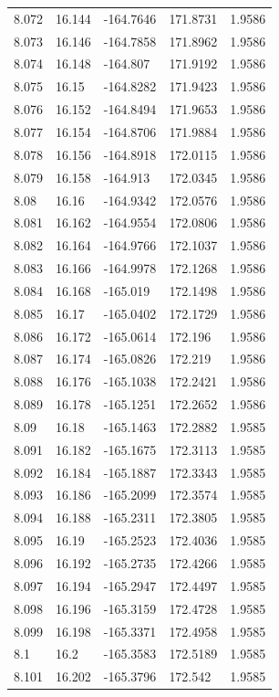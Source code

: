 \begin{tabular}{lllll}
8.072 & 16.144 & -164.7646 & 171.8731 & 1.9586 \\
8.073 & 16.146 & -164.7858 & 171.8962 & 1.9586 \\
8.074 & 16.148 & -164.807 & 171.9192 & 1.9586 \\
8.075 & 16.15 & -164.8282 & 171.9423 & 1.9586 \\
8.076 & 16.152 & -164.8494 & 171.9653 & 1.9586 \\
8.077 & 16.154 & -164.8706 & 171.9884 & 1.9586 \\
8.078 & 16.156 & -164.8918 & 172.0115 & 1.9586 \\
8.079 & 16.158 & -164.913 & 172.0345 & 1.9586 \\
8.08 & 16.16 & -164.9342 & 172.0576 & 1.9586 \\
8.081 & 16.162 & -164.9554 & 172.0806 & 1.9586 \\
8.082 & 16.164 & -164.9766 & 172.1037 & 1.9586 \\
8.083 & 16.166 & -164.9978 & 172.1268 & 1.9586 \\
8.084 & 16.168 & -165.019 & 172.1498 & 1.9586 \\
8.085 & 16.17 & -165.0402 & 172.1729 & 1.9586 \\
8.086 & 16.172 & -165.0614 & 172.196 & 1.9586 \\
8.087 & 16.174 & -165.0826 & 172.219 & 1.9586 \\
8.088 & 16.176 & -165.1038 & 172.2421 & 1.9586 \\
8.089 & 16.178 & -165.1251 & 172.2652 & 1.9586 \\
8.09 & 16.18 & -165.1463 & 172.2882 & 1.9585 \\
8.091 & 16.182 & -165.1675 & 172.3113 & 1.9585 \\
8.092 & 16.184 & -165.1887 & 172.3343 & 1.9585 \\
8.093 & 16.186 & -165.2099 & 172.3574 & 1.9585 \\
8.094 & 16.188 & -165.2311 & 172.3805 & 1.9585 \\
8.095 & 16.19 & -165.2523 & 172.4036 & 1.9585 \\
8.096 & 16.192 & -165.2735 & 172.4266 & 1.9585 \\
8.097 & 16.194 & -165.2947 & 172.4497 & 1.9585 \\
8.098 & 16.196 & -165.3159 & 172.4728 & 1.9585 \\
8.099 & 16.198 & -165.3371 & 172.4958 & 1.9585 \\
8.1 & 16.2 & -165.3583 & 172.5189 & 1.9585 \\
8.101 & 16.202 & -165.3796 & 172.542 & 1.9585 \\

\end{tabular}
